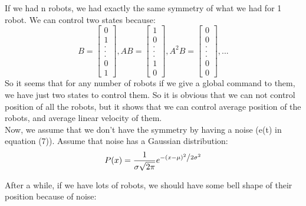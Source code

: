 \documentclass[10pt,letterpaper]{article}
\begin{document}
\begin{flushleft}
If we had n robots, we had exactly the same symmetry of what we had for 1 robot. We can control two states because:
\begin{equation}
 B= \begin{bmatrix} 
0\\
1\\
.\\
.\\
.\\
0\\
1
\end{bmatrix}
,
 AB= \begin{bmatrix} 
1\\
0\\
.\\
.\\
.\\
1\\
0
\end{bmatrix}
,
 A^2B= \begin{bmatrix} 
0\\
0\\
.\\
.\\
.\\
0\\
0
\end{bmatrix}, ...
\end{equation}  So it seems that for any number of robots if we give a global command to them, we have just two states to control them. So it is obvious that we can not control position of all the robots, but it shows that we can control average position of the robots, and average linear velocity of them.\\

Now, we assume that we don't have the symmetry by having a noise (e(t) in equation (7)). Assume that noise has a Gaussian distribution:\\
\begin{equation}
P(x) = \frac{1}{{\sigma \sqrt {2\pi } }}e^{{{ - \left( {x - \mu } \right)^2 } \mathord{\left/ {\vphantom {{ - \left( {x - \mu } \right)^2 } {2\sigma ^2 }}} \right. \kern-\nulldelimiterspace} {2\sigma ^2 }}}
\end{equation}

After a while, if we have lots of robots, we should have some bell shape of their position because of noise:\\
\end{flushleft}
\end{document}
